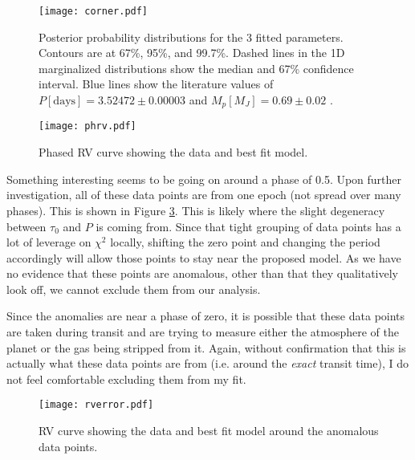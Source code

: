 \documentclass[11pt]{paper}
\begin{document}
\begin{figure}
\begin{center}
    \texttt{[image: corner.pdf]}
    \caption{Posterior probability distributions for the 3 fitted parameters. Contours are at 67\%, 95\%, and 99.7\%. Dashed lines in the 1D marginalized distributions show the median and 67\% confidence interval. Blue lines show the literature values of $P[\mathrm{days}]=3.52472\pm0.00003$ and $M_p[M_J]=0.69\pm0.02$ \citep{e}.}
    \label{fig:corner}
\end{center}
\end{figure}

\begin{figure}
\begin{center}
    \texttt{[image: phrv.pdf]}
    \caption{Phased RV curve showing the data and best fit model.}
    \label{fig:rv}
\end{center}
\end{figure}

Something interesting seems to be going on around a phase of 0.5. Upon further investigation, all of these data points are from one epoch (not spread over many phases). This is shown in Figure \ref{fig:err}. This is likely where the slight degeneracy between $\tau_0$ and $P$ is coming from. Since that tight grouping of data points has a lot of leverage on $\chi^2$ locally, shifting the zero point and changing the period accordingly will allow those points to stay near the proposed model. As we have no evidence that these points are anomalous, other than that they qualitatively look off, we cannot exclude them from our analysis. 

Since the anomalies are near a phase of zero, it is possible that these data points are taken during transit and are trying to measure either the atmosphere of the planet or the gas being stripped from it. Again, without confirmation that this is actually what these data points are from (i.e. around the \emph{exact} transit time), I do not feel comfortable excluding them from my fit.

\begin{figure}
\begin{center}
    \texttt{[image: rverror.pdf]}
    \caption{RV curve showing the data and best fit model around the anomalous data points.}
    \label{fig:err}
\end{center}
\end{figure}

\setlength\bibsep{0pt}


\end{document}
